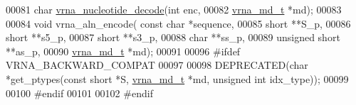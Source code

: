 \begin{DoxyCode}
00081 \textcolor{keywordtype}{char} \hyperlink{alphabet_8h_a48ef585e697be9c8a08ed68c655e29b6}{vrna\_nucleotide\_decode}(\textcolor{keywordtype}{int} enc,
00082                             \hyperlink{group__model__details_structvrna__md__s}{vrna\_md\_t} *md);
00083 
00084 \textcolor{keywordtype}{void} vrna\_aln\_encode( \textcolor{keyword}{const} \textcolor{keywordtype}{char} *sequence,
00085                       \textcolor{keywordtype}{short} **S\_p,
00086                       \textcolor{keywordtype}{short} **s5\_p,
00087                       \textcolor{keywordtype}{short} **s3\_p,
00088                       \textcolor{keywordtype}{char} **ss\_p,
00089                       \textcolor{keywordtype}{unsigned} \textcolor{keywordtype}{short} **as\_p,
00090                       \hyperlink{group__model__details_structvrna__md__s}{vrna\_md\_t} *md);
00091 
00096 \textcolor{preprocessor}{#ifdef  VRNA\_BACKWARD\_COMPAT}
00097 
00098 DEPRECATED(\textcolor{keywordtype}{char}  *get\_ptypes(\textcolor{keyword}{const} \textcolor{keywordtype}{short} *S, \hyperlink{group__model__details_structvrna__md__s}{vrna\_md\_t} *md, \textcolor{keywordtype}{unsigned} \textcolor{keywordtype}{int} idx\_type));
00099 
00100 \textcolor{preprocessor}{#endif}
00101 
00102 \textcolor{preprocessor}{#endif}
\end{DoxyCode}
